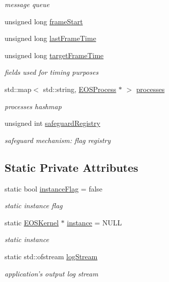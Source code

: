 \begin{CompactItemize}
\begin{CompactList}\small\item\em message queue \item\end{CompactList}\item 
unsigned long \hyperlink{structEOSKernel_200122496966050fd49e27dd74323093}{frameStart}
\item 
unsigned long \hyperlink{structEOSKernel_288bf0407fc19109c67102df51a4774c}{lastFrameTime}
\item 
unsigned long \hyperlink{structEOSKernel_96244c5052baeb3cb4915e655a12b50d}{targetFrameTime}
\begin{CompactList}\small\item\em fields used for timing purposes \item\end{CompactList}\item 
std::map$<$ std::string, \hyperlink{classEOSProcess}{EOSProcess} $\ast$ $>$ \hyperlink{structEOSKernel_2ef28158d540dabd63d2020e082fa925}{processes}
\begin{CompactList}\small\item\em processes hashmap \item\end{CompactList}\item 
unsigned int \hyperlink{structEOSKernel_1624f33c49b9fcdd0a0b4a8bd2342267}{safeguardRegistry}
\begin{CompactList}\small\item\em safeguard mechanism: flag registry \item\end{CompactList}\end{CompactItemize}
\subsection*{Static Private Attributes}
\begin{CompactItemize}
\item 
static bool \hyperlink{structEOSKernel_73cfb100d6374fd4cd0f5a7e80179b06}{instanceFlag} = false
\begin{CompactList}\small\item\em static instance flag \item\end{CompactList}\item 
static \hyperlink{structEOSKernel}{EOSKernel} $\ast$ \hyperlink{structEOSKernel_b29a9811607e25ec65e6432fec112c74}{instance} = NULL
\begin{CompactList}\small\item\em static instance \item\end{CompactList}\item 
static std::ofstream \hyperlink{structEOSKernel_06d1a03f14d2102f0e92196db921a13e}{logStream}
\begin{CompactList}\small\item\em application's output log stream \item\end{CompactList}\end{CompactItemize}


